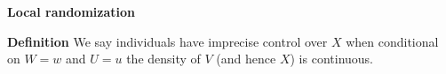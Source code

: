 \begin{frame}

\begin{figure}[htp]\centering
{}
\end{figure}

\end{frame}
\begin{frame}\textbf{Local randomization}\vspace{0.3cm}

\textbf{Definition} We say individuals have imprecise control over $X$ when conditional on $W = w$ and $U = u$ the density of $V$ (and hence $X$) is continuous.

\end{frame}

